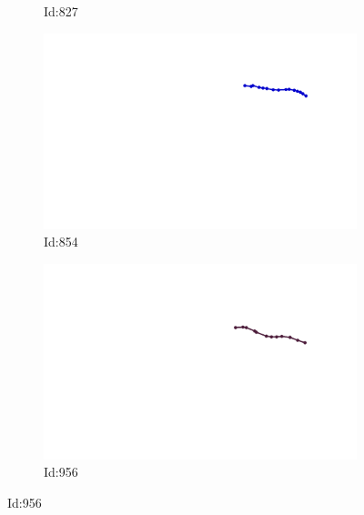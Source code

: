 \documentclass[12pt,twoside]{report}
\begin{document}
\begin{figure}
\begin{subfigure}[b]{0.20\textwidth}
\caption{Id:827}
\end{subfigure}
\begin{subfigure}[b]{0.20\textwidth}
\centering
\includegraphics[width=\textwidth]{../../trajectories/854.png}
\caption{Id:854}
\end{subfigure}
\begin{subfigure}[b]{0.20\textwidth}
\centering
\includegraphics[width=\textwidth]{../../trajectories/956.png}
\caption{Id:956}
\end{subfigure}
\end{figure}
\end{document}
